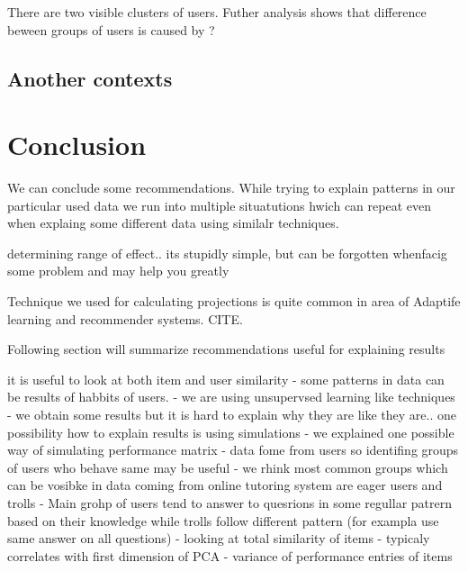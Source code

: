 \documentclass[
  digital, %
  table,   %
  nolof,     %
  nolot,     %
  nocover
]{fithesis3}
\begin{document}
There are two visible clusters of users. Futher analysis shows that
difference beween groups of users is caused by ?

\section{Another contexts}\label{another-contexts}



\chapter{Conclusion}


We can conclude some recommendations. While trying to explain patterns
in our particular used data we run into multiple situatutions hwich can
repeat even when explaing some different data using similalr techniques.


determining range of effect.. its stupidly simple, but can be forgotten whenfacig some problem and may help you greatly


Technique we used for calculating projections is quite common in area of
Adaptife learning and recommender systems. CITE.


Following section will summarize recommendations useful for explaining
results

it is useful to look at both item and user similarity - some
patterns in data can be results of habbits of users. - we are using
unsupervsed learning like techniques - we obtain some results but it is
hard to explain why they are like they are.. one possibility how to
explain results is using simulations - we explained one possible way of
simulating performance matrix - data fome from users so identifing
groups of users who behave same may be useful - we rhink most common
groups which can be vosibke in data coming from online tutoring system
are eager users and trolls - Main grohp of users tend to answer to
quesrions in some regullar patrern based on their knowledge while trolls
follow different pattern (for exampla use same answer on all questions)
- looking at total similarity of items - typicaly correlates with first
dimension of PCA - variance of performance entries of items
\end{document}
